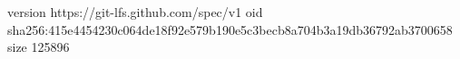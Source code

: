 version https://git-lfs.github.com/spec/v1
oid sha256:415e4454230c064de18f92e579b190e5c3becb8a704b3a19db36792ab3700658
size 125896
